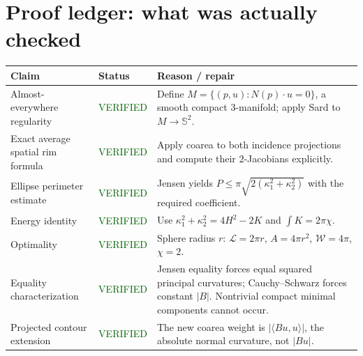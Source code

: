 \documentclass[11pt,a4paper]{article}
\newcommand{\pass}{\textcolor{darkgreen}{\textsf{VERIFIED}}}
\begin{document}
\section*{Proof ledger: what was actually checked}
\renewcommand{\arraystretch}{1.25}
\begin{tabularx}{\linewidth}{@{}p{3.3cm}p{2cm}X@{}}\toprule
Claim & Status & Reason / repair \\\midrule
Almost-everywhere regularity & \pass & Define $M=\{(p,u):N(p)\cdot u=0\}$, a smooth compact 3-manifold; apply Sard to $M\to\mathbb S^2$.\\
Exact average spatial rim formula & \pass & Apply coarea to both incidence projections and compute their $2$-Jacobians explicitly.\\
Ellipse perimeter estimate & \pass & Jensen yields $P\leq\pi\sqrt{2(\kappa_1^2+\kappa_2^2)}$ with the required coefficient.\\
Energy identity & \pass & Use $\kappa_1^2+\kappa_2^2=4H^2-2K$ and $\int K=2\pi\chi$.\\
Optimality & \pass & Sphere radius $r$: $\mathcal L=2\pi r$, $A=4\pi r^2$, $\mathcal W=4\pi$, $\chi=2$.\\
Equality characterization & \pass & Jensen equality forces equal squared principal curvatures; Cauchy--Schwarz forces constant $|B|$. Nontrivial compact minimal components cannot occur.\\
Projected contour extension & \pass & The new coarea weight is $|\langle Bu,u\rangle|$, the absolute normal curvature, not $|Bu|$.\\
\bottomrule
\end{tabularx}
\end{document}
